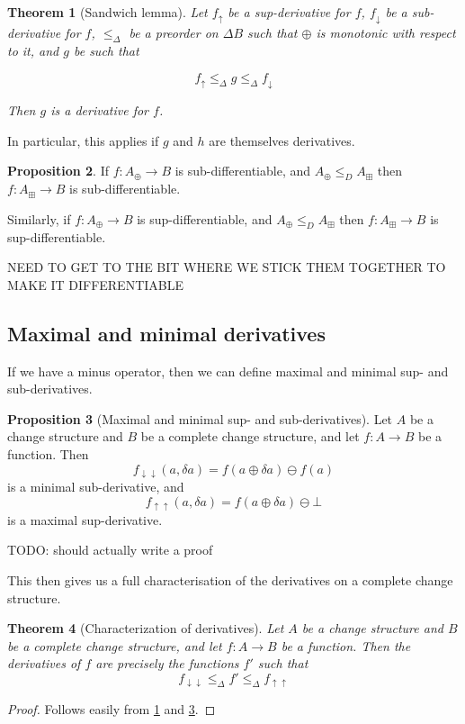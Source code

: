 \documentclass[english]{article}
\theoremstyle{plain}
\newtheorem{thm}{Theorem}
\theoremstyle{definition}
\newtheorem{prop}[thm]{Proposition}
\theoremstyle{remark}
\theoremstyle{remark}
\theoremstyle{remark}
\theoremstyle{definition}
\newcommand{\cplus}{\oplus}
\newcommand{\cpluss}{\boxplus}
\newcommand{\cminus}{\ominus}
\newcommand{\changes}[1]{\Delta #1}
\newcommand{\change}[1]{\delta #1}
\newcommand{\derive}[1]{#1'}
\newcommand{\supderive}[1]{#1_\uparrow}
\newcommand{\supderiveM}[1]{#1_{\uparrow\uparrow}}
\newcommand{\subderive}[1]{#1_\downarrow}
\newcommand{\subderiveM}[1]{#1_{\downarrow\downarrow}}
\newcommand{\changeOrder}{\leq_\Delta}
\newcommand{\fineOrder}{\leq_D}
\begin{document}
\begin{thm}[Sandwich lemma]
  \label{thm:sandwich}
  Let $\supderive{f}$ be a sup-derivative for $f$, $\subderive{f}$ be a sub-derivative for $f$, $\changeOrder$ be a preorder on $\changes{B}$ such that $\cplus$ is monotonic with
  respect to it, and $g$ be such that

  $$\supderive{f} \changeOrder g \changeOrder \subderive{f}$$

  Then $g$ is a derivative for $f$.
\end{thm}

In particular, this applies if $g$ and $h$ are themselves derivatives.

\begin{prop}
  If $f: A_\cplus \rightarrow B$ is sub-differentiable, and $A_\cplus \fineOrder
  A_\cpluss$ then $f: A_\cpluss \rightarrow B$ is sub-differentiable.
  
  Similarly, if $f: A_\cplus \rightarrow B$ is sup-differentiable, and $A_\cplus \fineOrder
  A_\cpluss$ then $f: A_\cpluss \rightarrow B$ is sup-differentiable.
\end{prop}

NEED TO GET TO THE BIT WHERE WE STICK THEM TOGETHER TO MAKE IT DIFFERENTIABLE

\subsection{Maximal and minimal derivatives}

If we have a minus operator, then we can define maximal and minimal sup- and sub-derivatives.

\begin{prop}[Maximal and minimal sup- and sub-derivatives]
  \label{prop:maximalDerivatives}
  Let $A$ be a change structure and $B$ be a complete change structure, and let $f: A \rightarrow B$ be a function. Then
  $$\subderiveM{f}(a, \change{a}) = f(a \cplus \change{a}) \cminus f(a)$$
  is a minimal sub-derivative, and
  $$\supderiveM{f}(a, \change{a}) = f(a \cplus \change{a}) \cminus \bot$$
  is a maximal sup-derivative.

  TODO: should actually write a proof
\end{prop}

This then gives us a full characterisation of the derivatives on a complete
change structure.

\begin{thm}[Characterization of derivatives]
  Let $A$ be a change structure and $B$ be a complete change structure, and let
  $f: A \rightarrow B$ be a function. Then the derivatives of $f$ are precisely
  the functions $\derive{f}$ such that
  $$\subderiveM{f} \changeOrder \derive{f} \changeOrder \supderiveM{f}$$
\end{thm}
\begin{proof}
  Follows easily from \ref{thm:sandwich} and \ref{prop:maximalDerivatives}.
\end{proof}
\end{document}
